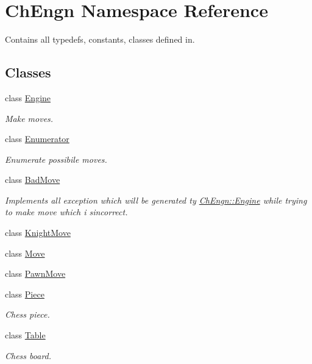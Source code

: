 \hypertarget{namespaceChEngn}{
\section{ChEngn Namespace Reference}
\label{namespaceChEngn}
}


Contains all typedefs, constants, classes defined in.  


\subsection*{Classes}
\begin{DoxyCompactItemize}
\item 
class \hyperlink{classChEngn_1_1Engine}{Engine}
\begin{DoxyCompactList}\small\item\em Make moves. \item\end{DoxyCompactList}\item 
class \hyperlink{classChEngn_1_1Enumerator}{Enumerator}
\begin{DoxyCompactList}\small\item\em Enumerate possibile moves. \item\end{DoxyCompactList}\item 
class \hyperlink{classChEngn_1_1BadMove}{BadMove}
\begin{DoxyCompactList}\small\item\em Implements all exception which will be generated ty \hyperlink{classChEngn_1_1Engine}{ChEngn::Engine} while trying to make move which i sincorrect. \item\end{DoxyCompactList}\item 
class \hyperlink{classChEngn_1_1KnightMove}{KnightMove}
\item 
class \hyperlink{classChEngn_1_1Move}{Move}
\item 
class \hyperlink{classChEngn_1_1PawnMove}{PawnMove}
\item 
class \hyperlink{classChEngn_1_1Piece}{Piece}
\begin{DoxyCompactList}\small\item\em Chess piece. \item\end{DoxyCompactList}\item 
class \hyperlink{classChEngn_1_1Table}{Table}
\begin{DoxyCompactList}\small\item\em Chess board. \item\end{DoxyCompactList}\end{DoxyCompactItemize}
